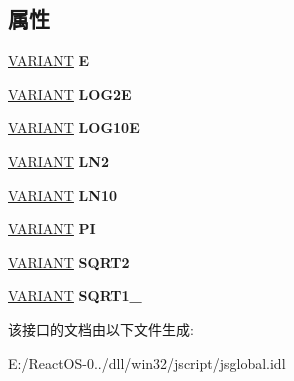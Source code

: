 \subsection*{属性}
\begin{DoxyCompactItemize}
\item 
\mbox{\label{interface_j_s_global_1_1_math_obj_a00f6a0f01cca0e91a15314cb83ecced1}} 
\hyperlink{structtag_v_a_r_i_a_n_t}{V\+A\+R\+I\+A\+NT} {\bfseries E}
\item 
\mbox{\label{interface_j_s_global_1_1_math_obj_a163d7eea5e83c720dc3131813b6f3a57}} 
\hyperlink{structtag_v_a_r_i_a_n_t}{V\+A\+R\+I\+A\+NT} {\bfseries L\+O\+G2E}
\item 
\mbox{\label{interface_j_s_global_1_1_math_obj_a06fb699e450fa121fd6ade8a7593ac36}} 
\hyperlink{structtag_v_a_r_i_a_n_t}{V\+A\+R\+I\+A\+NT} {\bfseries L\+O\+G10E}
\item 
\mbox{\label{interface_j_s_global_1_1_math_obj_a1c397eefe44825881fc396afa6a3bc46}} 
\hyperlink{structtag_v_a_r_i_a_n_t}{V\+A\+R\+I\+A\+NT} {\bfseries L\+N2}
\item 
\mbox{\label{interface_j_s_global_1_1_math_obj_a2bbe7975ff763a1143b5931b462b7e64}} 
\hyperlink{structtag_v_a_r_i_a_n_t}{V\+A\+R\+I\+A\+NT} {\bfseries L\+N10}
\item 
\mbox{\label{interface_j_s_global_1_1_math_obj_a52d6d172590471397353e704efeeb32b}} 
\hyperlink{structtag_v_a_r_i_a_n_t}{V\+A\+R\+I\+A\+NT} {\bfseries PI}
\item 
\mbox{\label{interface_j_s_global_1_1_math_obj_abf07d80bed62b367e844bd3d53656bbb}} 
\hyperlink{structtag_v_a_r_i_a_n_t}{V\+A\+R\+I\+A\+NT} {\bfseries S\+Q\+R\+T2}
\item 
\mbox{\label{interface_j_s_global_1_1_math_obj_aaa483538034a10bd1b036970b7a37d8e}} 
\hyperlink{structtag_v_a_r_i_a_n_t}{V\+A\+R\+I\+A\+NT} {\bfseries S\+Q\+R\+T1\+\_}
\end{DoxyCompactItemize}


该接口的文档由以下文件生成\+:\begin{DoxyCompactItemize}
\item 
E\+:/\+React\+O\+S-\/0../dll/win32/jscript/jsglobal.\+idl\end{DoxyCompactItemize}
